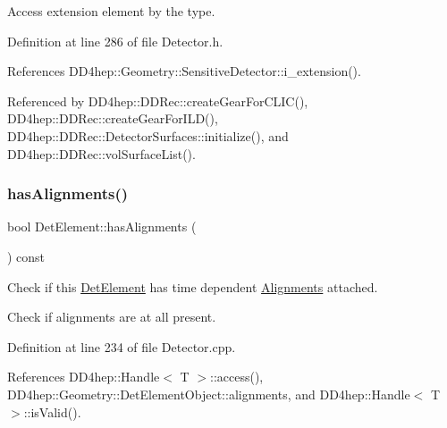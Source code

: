 Access extension element by the type. 



Definition at line 286 of file Detector.\+h.



References D\+D4hep\+::\+Geometry\+::\+Sensitive\+Detector\+::i\+\_\+extension().



Referenced by D\+D4hep\+::\+D\+D\+Rec\+::create\+Gear\+For\+C\+L\+I\+C(), D\+D4hep\+::\+D\+D\+Rec\+::create\+Gear\+For\+I\+L\+D(), D\+D4hep\+::\+D\+D\+Rec\+::\+Detector\+Surfaces\+::initialize(), and D\+D4hep\+::\+D\+D\+Rec\+::vol\+Surface\+List().

\hypertarget{class_d_d4hep_1_1_geometry_1_1_det_element_a55209501a68e88fb028f6c507bee8f61}{}\label{class_d_d4hep_1_1_geometry_1_1_det_element_a55209501a68e88fb028f6c507bee8f61} 
\subsubsection{\texorpdfstring{has\+Alignments()}{hasAlignments()}}
{\footnotesize\ttfamily bool Det\+Element\+::has\+Alignments (\begin{DoxyParamCaption}{ }\end{DoxyParamCaption}) const}



Check if this \hyperlink{class_d_d4hep_1_1_geometry_1_1_det_element}{Det\+Element} has time dependent \hyperlink{namespace_d_d4hep_1_1_alignments}{Alignments} attached. 

Check if alignments are at all present. 

Definition at line 234 of file Detector.\+cpp.



References D\+D4hep\+::\+Handle$<$ T $>$\+::access(), D\+D4hep\+::\+Geometry\+::\+Det\+Element\+Object\+::alignments, and D\+D4hep\+::\+Handle$<$ T $>$\+::is\+Valid().

\hypertarget{class_d_d4hep_1_1_geometry_1_1_det_element_a84cb757ef462d38cd9b185ccb448dcdf}{}\label{class_d_d4hep_1_1_geometry_1_1_det_element_a84cb757ef462d38cd9b185ccb448dcdf} 
